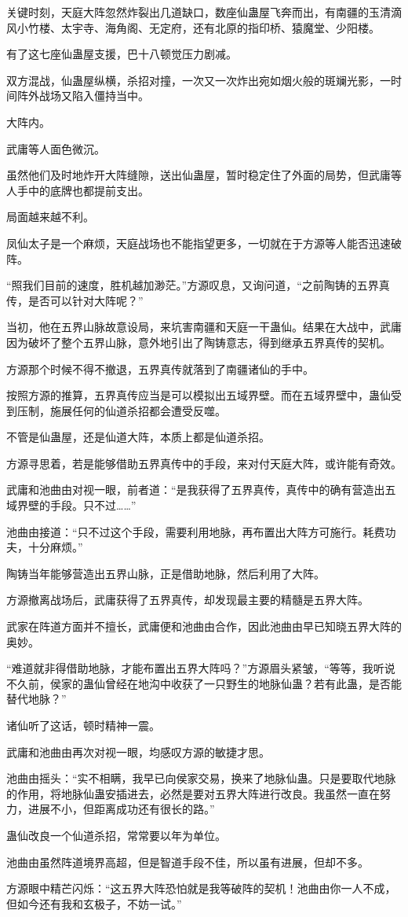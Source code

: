 \begin{this_body}
关键时刻，天庭大阵忽然炸裂出几道缺口，数座仙蛊屋飞奔而出，有南疆的玉清滴风小竹楼、太宇寺、海角阁、无定府，还有北原的指印桥、猿魔堂、少阳楼。

有了这七座仙蛊屋支援，巴十八顿觉压力剧减。

双方混战，仙蛊屋纵横，杀招对撞，一次又一次炸出宛如烟火般的斑斓光影，一时间阵外战场又陷入僵持当中。

大阵内。

武庸等人面色微沉。

虽然他们及时地炸开大阵缝隙，送出仙蛊屋，暂时稳定住了外面的局势，但武庸等人手中的底牌也都提前支出。

局面越来越不利。

凤仙太子是一个麻烦，天庭战场也不能指望更多，一切就在于方源等人能否迅速破阵。

“照我们目前的速度，胜机越加渺茫。”方源叹息，又询问道，“之前陶铸的五界真传，是否可以针对大阵呢？”

当初，他在五界山脉故意设局，来坑害南疆和天庭一干蛊仙。结果在大战中，武庸因为破坏了整个五界山脉，意外地引出了陶铸意志，得到继承五界真传的契机。

方源那个时候不得不撤退，五界真传就落到了南疆诸仙的手中。

按照方源的推算，五界真传应当是可以模拟出五域界壁。而在五域界壁中，蛊仙受到压制，施展任何的仙道杀招都会遭受反噬。

不管是仙蛊屋，还是仙道大阵，本质上都是仙道杀招。

方源寻思着，若是能够借助五界真传中的手段，来对付天庭大阵，或许能有奇效。

武庸和池曲由对视一眼，前者道：“是我获得了五界真传，真传中的确有营造出五域界壁的手段。只不过……”

池曲由接道：“只不过这个手段，需要利用地脉，再布置出大阵方可施行。耗费功夫，十分麻烦。”

陶铸当年能够营造出五界山脉，正是借助地脉，然后利用了大阵。

方源撤离战场后，武庸获得了五界真传，却发现最主要的精髓是五界大阵。

武家在阵道方面并不擅长，武庸便和池曲由合作，因此池曲由早已知晓五界大阵的奥妙。

“难道就非得借助地脉，才能布置出五界大阵吗？”方源眉头紧皱，“等等，我听说不久前，侯家的蛊仙曾经在地沟中收获了一只野生的地脉仙蛊？若有此蛊，是否能替代地脉？”

诸仙听了这话，顿时精神一震。

武庸和池曲由再次对视一眼，均感叹方源的敏捷才思。

池曲由摇头：“实不相瞒，我早已向侯家交易，换来了地脉仙蛊。只是要取代地脉的作用，将地脉仙蛊安插进去，必然是要对五界大阵进行改良。我虽然一直在努力，进展不小，但距离成功还有很长的路。”

蛊仙改良一个仙道杀招，常常要以年为单位。

池曲由虽然阵道境界高超，但是智道手段不佳，所以虽有进展，但却不多。

方源眼中精芒闪烁：“这五界大阵恐怕就是我等破阵的契机！池曲由你一人不成，但如今还有我和玄极子，不妨一试。”

\end{this_body}

